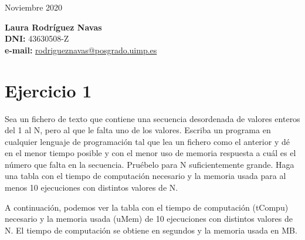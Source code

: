 \documentclass{uimppracticas}
\begin{document}
	
\frontmatter


\begin{center}
	\large Noviembre 2020
\end{center}

\vspace{30mm}

\begin{flushright}
	{\bf Laura Rodríguez Navas}\\
	\textbf{DNI:} 43630508-Z\\
	\textbf{e-mail:} \href{rodrigueznavas@posgrado.uimp.es}{rodrigueznavas@posgrado.uimp.es}
\end{flushright}

\newpage

\tableofcontents

\newpage

\mainmatter

\section{Ejercicio 1}

Sea un fichero de texto que contiene una secuencia desordenada de valores enteros del 1 al N, pero al que le falta uno de los valores. Escriba un programa en cualquier lenguaje de programación tal que lea un fichero como el anterior y dé en el menor tiempo posible y con el menor uso de memoria respuesta a cuál es el número que falta en la secuencia. Pruébelo para N suficientemente grande. Haga una tabla con el tiempo de computación necesario y la memoria usada para al menos 10 ejecuciones con distintos valores de N.



A continuación, podemos ver la tabla con el tiempo de computación (tCompu) necesario y la memoria usada (uMem) de 10 ejecuciones con distintos valores de N. El tiempo de computación se obtiene en segundos y la memoria usada en MB. 
\end{document}
